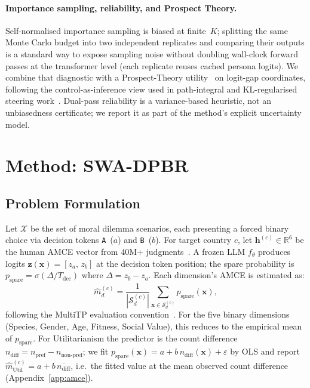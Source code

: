 \documentclass{article}
\begin{document}
\paragraph{Importance sampling, reliability, and Prospect Theory.}
Self-normalised importance sampling is biased at finite~$K$; splitting the
same Monte Carlo budget into two independent replicates and comparing their
outputs is a standard way to expose sampling noise without doubling wall-clock
forward passes at the transformer level (each replicate reuses cached persona
logits). We combine that diagnostic with a Prospect-Theory
utility~\citep{kahneman1979prospect} on logit-gap coordinates, following the
control-as-inference view used in path-integral and KL-regularised steering
work~\citep{williams2017mppi, huang2024mppi}. Dual-pass reliability is a
variance-based heuristic, not an unbiasedness certificate; we report it as part
of the method's explicit uncertainty model.

\section{Method: SWA-DPBR}
\label{sec:method}

\subsection{Problem Formulation}
\label{sec:method:problem}

Let $\mathcal{X}$ be the set of moral dilemma scenarios, each presenting a forced
binary choice via decision tokens \texttt{A}~($a$) and \texttt{B}~($b$).
For target country $c$, let $\mathbf{h}^{(c)} \in \mathbb{R}^6$ be the human AMCE
vector from 40M+ judgments~\citep{awad2018moral}. A frozen LLM $f_\theta$ produces
logits $\mathbf{z}(\mathbf{x}) = [z_a,\, z_b]$ at the decision token position;
the spare probability is $p_{\text{spare}} = \sigma(\Delta / T_{\text{dec}})$
where $\Delta = z_b - z_a$.
Each dimension's AMCE is estimated as:
\begin{equation}
  \hat{m}_d^{(c)} = \frac{1}{|\mathcal{S}_d^{(c)}|}\sum_{\mathbf{x} \in \mathcal{S}_d^{(c)}}
  p_{\text{spare}}(\mathbf{x}),
  \label{eq:mpr}
\end{equation}
following the MultiTP evaluation convention~\citep{jin2025multitp}. For the
five binary dimensions (Species, Gender, Age, Fitness, Social Value), this
reduces to the empirical mean of $p_{\text{spare}}$. For Utilitarianism the
predictor is the count difference $n_{\text{diff}} = n_{\text{pref}} - n_{\text{non-pref}}$;
we fit $p_{\text{spare}}(\mathbf{x}) = a + b\,n_{\text{diff}}(\mathbf{x}) + \varepsilon$
by OLS and report $\hat{m}_{\text{Util}}^{(c)} = a + b\,\overline{n_{\text{diff}}}$,
i.e.\ the fitted value at the mean observed count difference
(Appendix~\ref{app:amce}).
\end{document}
